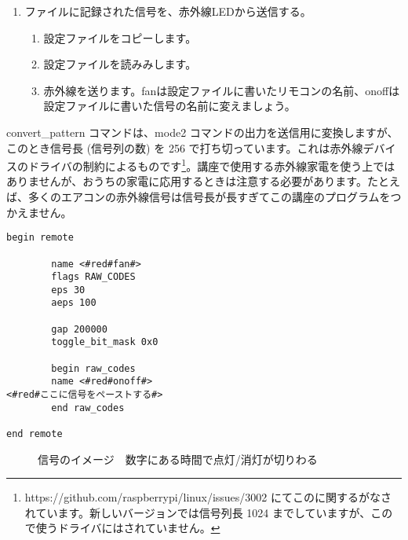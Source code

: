\begin{tcolorbox}[title=\useOmetoi]
\begin{enumerate}
\begin{enumerate}[1]
\begin{enumerate}[(1)]
  \end{enumerate}
 \end{enumerate}
\item ファイルに記録された信号を、赤外線LEDから送信する。
 \begin{enumerate}[1]
  \item 設定ファイルをコピーします。 \\ 
  \item 設定ファイルを読みみします。\\ 
  \item 赤外線を送ります。fanは設定ファイルに書いたリモコンの名前、onoffは設定ファイルに書いた信号の名前に変えましょう。\\ 
 \end{enumerate}
\end{enumerate}
\end{tcolorbox}

convert\_pattern コマンドは、mode2 コマンドの出力を送信用に変換しますが、このとき信号長 (信号列の数) を 256 で打ち切っています。これは赤外線デバイスのドライバの制約によるものです\footnote{https://github.com/raspberrypi/linux/issues/3002 にてこのに関するがなされています。新しいバージョンでは信号列長 1024 までしていますが、こので使うドライバにはされていません。}。講座で使用する赤外線家電を使う上ではありませんが、おうちの家電に応用するときは注意する必要があります。たとえば、多くのエアコンの赤外線信号は信号長が長すぎてこの講座のプログラムをつかえません。\\
\begin{lstlisting}[caption=template.lircd.conf,label=template.lircd.conf]
begin remote

        name <#red#fan#>
        flags RAW_CODES
        eps 30
        aeps 100

        gap 200000
        toggle_bit_mask 0x0

        begin raw_codes
        name <#red#onoff#>
<#red#ここに信号をペーストする#>
        end raw_codes

end remote
\end{lstlisting}

\begin{figure}[H]
    \centering
 
    \caption{信号のイメージ　数字にある時間で点灯/消灯が切りわる}
\end{figure}
